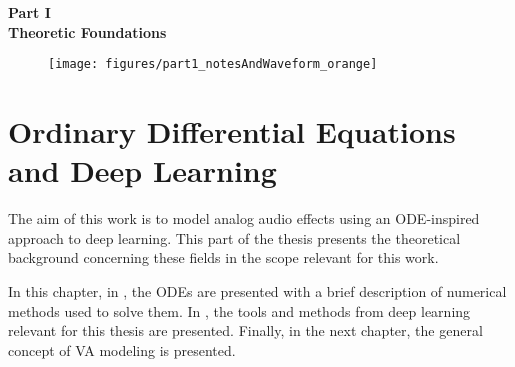 \cleardoublepage
\thispagestyle{empty}
\begin{center}
\vspace*{3cm}
{\huge \bf Part I}\\ \vspace*{1cm}
{\Huge \bf Theoretic Foundations}\\\vspace*{0.2cm}
\begin{figure}[ht]
\centering
\texttt{[image: figures/part1\_notesAndWaveform\_orange]}
\end{figure}
\end{center}
\label{par:part1}
\newpage
\quad
\thispagestyle{empty}
\newpage



\chapter{Ordinary Differential Equations and Deep Learning}
\label{chapter:Foundations}

The aim of this work is to model analog audio effects using an \ac{ODE}-inspired approach to deep learning. This part of the thesis presents the theoretical background concerning these fields in the scope relevant for this work. 

In this chapter, in , the \acp{ODE} are presented with a brief description of numerical methods used to solve them. In , the tools and methods from deep learning relevant for this thesis are presented. Finally, in the next chapter, the general concept of \ac{VA} modeling is presented.




